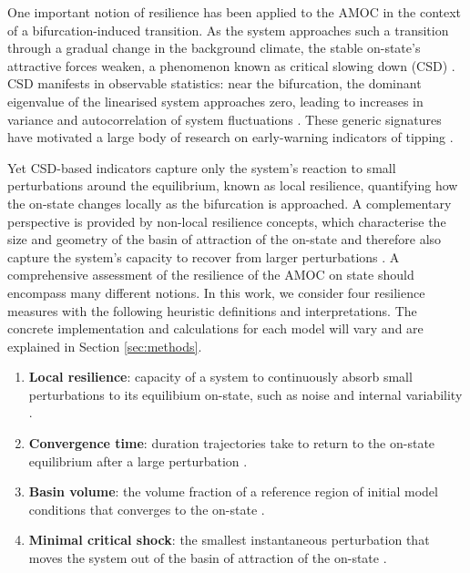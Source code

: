\documentclass[12pt, a4paper]{article}
\begin{document}
One important notion of resilience has been applied to the AMOC in the context of a bifurcation-induced transition. As the system approaches such a transition through a gradual change in the background climate, the stable on-state's attractive forces weaken, a phenomenon known as critical slowing down (CSD) \citep{Scheffer2009EWSNature}. CSD manifests in observable statistics: near the bifurcation, the dominant eigenvalue of the linearised system approaches zero, leading to increases in variance and autocorrelation of system fluctuations \citep{Held2004CSDDetection, Dakos2008CSDClimate}. These generic signatures have motivated a large body of research on early-warning indicators of tipping \citep{Lenton2011EarlyWarningClimate, Boers2021AMOCEWS, Ditlevsen2023AMOCPrediction}.

Yet CSD-based indicators capture only the system's reaction to small perturbations around the equilibrium, known as local resilience, quantifying how the on-state changes locally as the bifurcation is approached. A complementary perspective is provided by non-local resilience concepts, which characterise the size and geometry of the basin of attraction of the on-state and therefore also capture the system's capacity to recover from larger perturbations \citep{Holling1973ResilienceStabilityEcological, Gunderson2000EcologicalResilienceTheory, Menck2013BasinStability}. A comprehensive assessment of the resilience of the AMOC on state should encompass many different notions. In this work, we consider four resilience measures with the following heuristic definitions and interpretations. The concrete implementation and calculations for each model will vary and are explained in Section \ref{sec:methods}.

\begin{enumerate}
  \item \textbf{Local resilience}: capacity of a system to continuously absorb small perturbations to its equilibium on-state, such as noise and internal variability \citep{Arnoldi2016ResilienceMathComparison}.
  \item \textbf{Convergence time}: duration trajectories take to return to the on-state equilibrium after a large perturbation \citep{Neubert1997AlternativeResilience}.
  \item \textbf{Basin volume}: the volume fraction of a reference region of initial model conditions that converges to the on-state \citep{Menck2013BasinStability}.
  \item \textbf{Minimal critical shock}: the smallest instantaneous perturbation that moves the system out of the basin of attraction of the on-state \citep{Klinshov2015DistanceThresholdNumerical, Halekotte2020MinimalFatalShocks}.
\end{enumerate}
\end{document}
